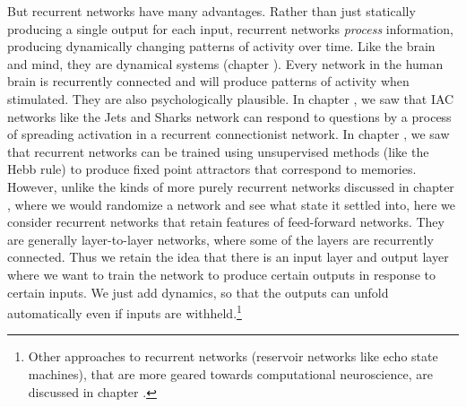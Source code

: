 But recurrent networks have many advantages. Rather than just statically producing a single output for each input, recurrent networks \emph{process} information, producing dynamically changing patterns of activity over time. Like the brain and mind, they are dynamical systems (chapter ). Every network in the human brain is recurrently connected and will produce patterns of activity when stimulated. They are also psychologically plausible. In chapter , we saw that IAC networks like the Jets and Sharks network can respond to questions by a process of spreading activation in a recurrent connectionist network. In chapter , we saw that recurrent networks can be trained using unsupervised methods (like the Hebb rule) to produce fixed point attractors that correspond to memories.  However, unlike the kinds of more purely recurrent networks discussed in chapter , where we would randomize a network and see what state it settled into, here we consider recurrent networks that retain features of feed-forward networks. They are generally layer-to-layer networks,  where some of the layers are recurrently connected. Thus we retain the idea that there is an input layer and output layer where we want to train the network to produce certain outputs in response to certain inputs.  We just add dynamics, so that the outputs can unfold automatically even if inputs are withheld.\footnote{Other approaches to recurrent networks (reservoir networks like echo state machines), that are more geared towards computational neuroscience, are discussed in chapter .}

